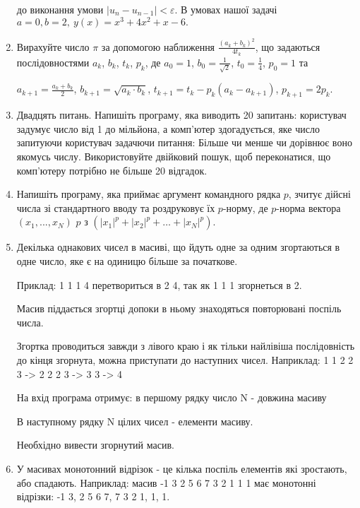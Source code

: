 \documentclass[]{article}
\begin{document}
\begin{enumerate}
до виконання умови \(\left| u_{n} - u_{n - 1} \right| < \varepsilon\). В
умовах нашої задачі \(a = 0,b = 2,\ y(x) = x^{3} + 4x^{2} + x - 6.\)


\item
Вирахуйте число $\pi$ за допомогою наближення $\frac{(a_{k} + b_{k})^{2}}{4t_{k}}$,
що задаються послідовностями $a_k$, $b_k$, $t_k$, $p_k$, де
$a_0 = 1$, $b_0 = \frac{1}{\sqrt{2}}$, $t_0 = \frac{1}{4}$, $p_0 = 1$ та

$a_{k+1} = \frac{a_{k} + b_{k}}{2}$, $b_{k+1} = \sqrt{a_{k}\cdot b_{k}}$, 
$t_{k+1} = t_{k} - p_{k}(a_{k}-a_{k+1})$, $p_{k+1} =2p_{k}$.





\item
Двадцять питань.
 Напишіть програму, яка виводить 20 запитань:
 користувач задумує число від 1 до мільйона, а комп’ютер здогадується, яке число запитуючи користувач задачючи питання:
Більше чи менше чи дорівнює воно якомусь числу.
Використовуйте двійковий пошук, щоб переконатися, що комп’ютеру потрібно не більше 20 відгадок.


\item Напишіть програму, яка приймає аргумент командного рядка $p$,
зчитує дійсні числа зі стандартного вводу та роздруковує їх $p$-норму, 
де $p$-норма вектора $(x_{1}, ..., x_{N})$  $p$ з $(|x_{1}|^{p} + |x_{2}|^{p} + \ldots + | x_{N}|^{p})$.


\item
Декілька однакових чисел в масиві, що йдуть одне за одним згортаються в одне число, яке є на одиницю більше за початкове.

Приклад: 1 1 1 4 перетвориться в 2 4, так як 1 1 1 згорнеться в 2.

Масив піддається згортці допоки в ньому знаходяться повторювані поспіль числа.

Згортка проводиться завжди з лівого краю і як тільки найлівіша послідовність до кінця згорнута,
можна приступати до наступних чисел. Наприклад: 1 1 2 2 3 -> 2 2 2 3 -> 3 3 -> 4

На вхід програма отримує: в першому рядку число N - довжина масиву

В наступному рядку N цілих чисел - елементи масиву.

Необхідно вивести згорнутий масив.

\item

У масивах монотонний відрізок - це кілька поспіль елементів які зростають, або спадають.
Наприклад: масив -1 3 2 5 6 7 3 2 1 1 1 має монотонні відрізки: -1 3, 2 5 6 7, 7 3 2 1, 1, 1.


\end{enumerate}
\end{document}
